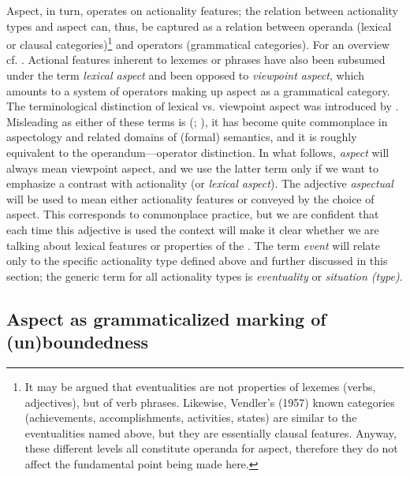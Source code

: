 \documentclass[output=paper]{langsci/langscibook}
\begin{document}
Aspect, in turn, operates on actionality features; the relation between actionality types and aspect can, thus, be captured as a relation between operanda (lexical or clausal categories)\footnote{It may be argued that eventualities are not properties of lexemes (verbs, adjectives), but of verb phrases. Likewise, Vendler’s (1957) known categories (achievements, accomplishments, activities, states) are similar to the eventualities named above, but they are essentially clausal features. Anyway, these different levels all constitute operanda for aspect, therefore they do not affect the fundamental point being made here.} and operators (grammatical categories). For an overview cf. \citet{Sasse2002}. Actional features inherent to lexemes or phrases have also been subsumed under the term \textit{lexical aspect} and been opposed to \textit{viewpoint aspect}, which amounts to a system of operators making up aspect as a grammatical category. The terminological distinction of lexical vs. viewpoint aspect was introduced by \citet{Smith1991}. Misleading as either of these terms is (\citealt[28]{Johanson2000}; \citealt[405f.]{Plungjan2011}), it has become quite commonplace in aspectology and related domains of (formal) semantics, and it is roughly equivalent to the operandum—operator distinction. In what follows, \textit{aspect} will always mean viewpoint aspect, and we use the latter term only if we want to emphasize a contrast with actionality (or \textit{lexical aspect}). The adjective \textit{aspectual} will be used to mean either actionality features or  conveyed by the choice of aspect. This corresponds to commonplace practice, but we are confident that each time this adjective is used the context will make it clear whether we are talking about lexical features or properties of the . The term \textit{event} will relate only to the specific actionality type defined above and further discussed in this section; the generic term for all actionality types is \textit{eventuality} or \textit{situation (type)}.

\subsection{Aspect as grammaticalized marking of (un)boundedness}\label{sec:wiemerserzant:2.2}
\end{document}
